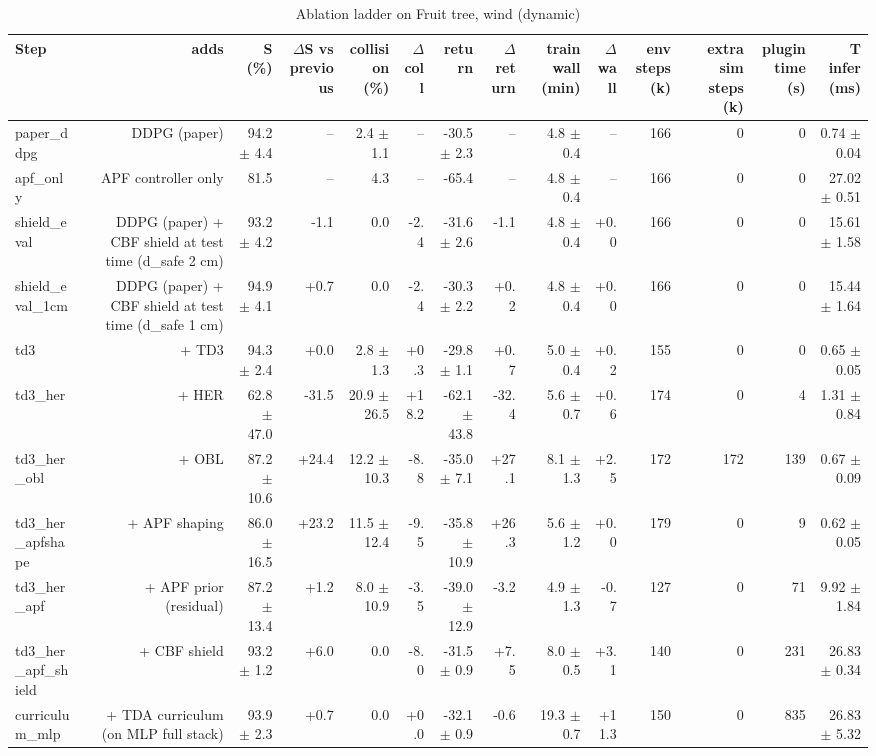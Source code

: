 \begin{table}[t]
\centering
\caption{Ablation ladder on Fruit tree, wind (dynamic)}
\label{tab:ladder_wind}
\small
\begin{tabular}{lrrrrrrrrrrrrr}
\toprule
Step & adds & S (\%) & $\Delta$S vs previous & collision (\%) & $\Delta$coll & return & $\Delta$return & train wall (min) & $\Delta$wall & env steps (k) & extra sim steps (k) & plugin time (s) & T infer (ms) \\
\midrule
paper\_ddpg & DDPG (paper) & 94.2 $\pm$ 4.4 & -- & 2.4 $\pm$ 1.1 & -- & -30.5 $\pm$ 2.3 & -- & 4.8 $\pm$ 0.4 & -- & 166 & 0 & 0 & 0.74 $\pm$ 0.04 \\
apf\_only & APF controller only & 81.5 & -- & 4.3 & -- & -65.4 & -- & 4.8 $\pm$ 0.4 & -- & 166 & 0 & 0 & 27.02 $\pm$ 0.51 \\
shield\_eval & DDPG (paper) + CBF shield at test time (d\_safe 2 cm) & 93.2 $\pm$ 4.2 & -1.1 & 0.0 & -2.4 & -31.6 $\pm$ 2.6 & -1.1 & 4.8 $\pm$ 0.4 & +0.0 & 166 & 0 & 0 & 15.61 $\pm$ 1.58 \\
shield\_eval\_1cm & DDPG (paper) + CBF shield at test time (d\_safe 1 cm) & 94.9 $\pm$ 4.1 & +0.7 & 0.0 & -2.4 & -30.3 $\pm$ 2.2 & +0.2 & 4.8 $\pm$ 0.4 & +0.0 & 166 & 0 & 0 & 15.44 $\pm$ 1.64 \\
td3 & + TD3 & 94.3 $\pm$ 2.4 & +0.0 & 2.8 $\pm$ 1.3 & +0.3 & -29.8 $\pm$ 1.1 & +0.7 & 5.0 $\pm$ 0.4 & +0.2 & 155 & 0 & 0 & 0.65 $\pm$ 0.05 \\
td3\_her & + HER & 62.8 $\pm$ 47.0 & -31.5 & 20.9 $\pm$ 26.5 & +18.2 & -62.1 $\pm$ 43.8 & -32.4 & 5.6 $\pm$ 0.7 & +0.6 & 174 & 0 & 4 & 1.31 $\pm$ 0.84 \\
td3\_her\_obl & + OBL & 87.2 $\pm$ 10.6 & +24.4 & 12.2 $\pm$ 10.3 & -8.8 & -35.0 $\pm$ 7.1 & +27.1 & 8.1 $\pm$ 1.3 & +2.5 & 172 & 172 & 139 & 0.67 $\pm$ 0.09 \\
td3\_her\_apfshape & + APF shaping & 86.0 $\pm$ 16.5 & +23.2 & 11.5 $\pm$ 12.4 & -9.5 & -35.8 $\pm$ 10.9 & +26.3 & 5.6 $\pm$ 1.2 & +0.0 & 179 & 0 & 9 & 0.62 $\pm$ 0.05 \\
td3\_her\_apf & + APF prior (residual) & 87.2 $\pm$ 13.4 & +1.2 & 8.0 $\pm$ 10.9 & -3.5 & -39.0 $\pm$ 12.9 & -3.2 & 4.9 $\pm$ 1.3 & -0.7 & 127 & 0 & 71 & 9.92 $\pm$ 1.84 \\
td3\_her\_apf\_shield & + CBF shield & 93.2 $\pm$ 1.2 & +6.0 & 0.0 & -8.0 & -31.5 $\pm$ 0.9 & +7.5 & 8.0 $\pm$ 0.5 & +3.1 & 140 & 0 & 231 & 26.83 $\pm$ 0.34 \\
curriculum\_mlp & + TDA curriculum (on MLP full stack) & 93.9 $\pm$ 2.3 & +0.7 & 0.0 & +0.0 & -32.1 $\pm$ 0.9 & -0.6 & 19.3 $\pm$ 0.7 & +11.3 & 150 & 0 & 835 & 26.83 $\pm$ 5.32 \\

\end{tabular}
\end{table}
